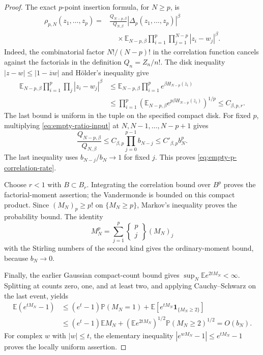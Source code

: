 \documentclass[11pt,a4paper]{article}
\numberwithin{equation}{section}
\theoremstyle{definition}
\theoremstyle{remark}
\begin{document}
\begin{proof}
The exact $p$-point insertion formula, for $N\geq p$, is
\begin{align*}
 \rho_{p,N}(z_1,\ldots,z_p)
 ={}&\frac{Q_{N-p,\beta}}{Q_{N,\beta}}|\Delta_p(z_1,\ldots,z_p)|^\beta\\
 &\quad\times\mathbb E_{N-p,\beta}
    \prod_{i=1}^p\prod_{j=1}^{N-p}|z_i-w_j|^\beta.
\end{align*}
Indeed, the combinatorial factor $N!/(N-p)!$ in the correlation function
cancels against the factorials in the definition $Q_n=Z_n/n!$.
The disk inequality $|z-w|\leq|1-\overline z w|$ and H\"older's
inequality give
\begin{align*}
 \mathbb E_{N-p,\beta}
    \prod_{i=1}^p\prod_j|z_i-w_j|^\beta
 &\leq\mathbb E_{N-p,\beta}
        \prod_{i=1}^p e^{\beta H_{N-p}(\overline z_i)}\\
 &\leq\prod_{i=1}^p
       \left(\mathbb E_{N-p,\beta}
                   e^{p\beta H_{N-p}(\overline z_i)}\right)^{1/p}
 \leq C_{\beta,p,r}.
\end{align*}
The last bound is uniform in the tuple on the specified compact disk.
For fixed $p$, multiplying \eqref{eq:empty-ratio-input} at
$N,N-1,\ldots,N-p+1$ gives
\[
 \frac{Q_{N-p,\beta}}{Q_{N,\beta}}
 \leq C_{\beta,p}\prod_{j=0}^{p-1}b_{N-j}
 \leq C'_{\beta,p}b_N^p.
\]
The last inequality uses $b_{N-j}/b_N\to1$ for fixed $j$. This proves
\eqref{eq:empty-p-correlation-rate}.

Choose $r<1$ with $B\subset B_r$. Integrating the correlation bound
over $B^p$ proves the factorial-moment assertion; the Vandermonde is
bounded on this compact product. Since $(M_N)_p\geq p!$ on
$\{M_N\geq p\}$, Markov's inequality proves the probability bound.
The identity
\[
 M_N^p=\sum_{j=1}^p
       \left\{\begin{matrix}p\\j\end{matrix}\right\}(M_N)_j
\]
with the Stirling numbers of the second kind gives the ordinary-moment
bound, because $b_N\to0$.

Finally, the earlier Gaussian compact-count bound gives
$\sup_N\mathbb E e^{2tM_N}<\infty$. Splitting at counts zero, one, and
at least two, and applying Cauchy--Schwarz on the last event, yields
\begin{align*}
 \mathbb E(e^{tM_N}-1)
 &\leq(e^t-1)\mathbb P(M_N=1)
       +\mathbb E[e^{tM_N}\mathbf1_{\{M_N\geq2\}}]\\
 &\leq(e^t-1)\mathbb EM_N
       +(\mathbb Ee^{2tM_N})^{1/2}
             \mathbb P(M_N\geq2)^{1/2}
 =O(b_N).
\end{align*}
For complex $w$ with $|w|\leq t$, the elementary inequality
$|e^{wM_N}-1|\leq e^{tM_N}-1$ proves the locally uniform assertion.
\end{proof}
\end{document}
